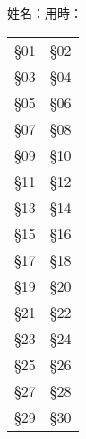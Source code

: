 \documentclass[20pt, a4paper]{article}
\begin{document}
    \thispagestyle{empty}
    \centering
    \LARGE
    

    \scalebox{3}{\bfseries 每日30題}
     
    \vspace{0.8cm}
     
     \hspace{1.5cm}%
     姓名：\hrulefill\quad 用時：\hrulefill


\vfill

  \setlength{\tabcolsep}{1cm}
  \renewcommand{\arraystretch}{1.7}
  \begin{tabular}{p{5cm}p{5cm}}
    §01 & §02 \\
    §03 & §04 \\
    §05 & §06 \\
    §07 & §08 \\
    §09 & §10 \\
    §11 & §12 \\
    §13 & §14 \\
    §15 & §16 \\
    §17 & §18 \\
    §19 & §20 \\
    §21 & §22 \\
    §23 & §24 \\
    §25 & §26 \\
    §27 & §28 \\
    §29 & §30 \\
\end{tabular}
\end{document}
